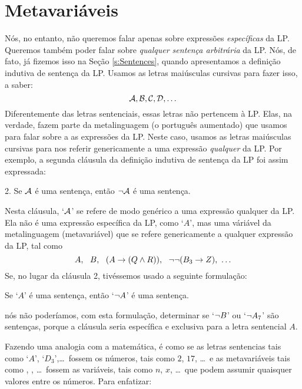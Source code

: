 \section{Metavariáveis}\label{s:Metavariables}
Nós, no entanto, não queremos falar apenas sobre expressões \emph{específicas} da LP. 
Queremos também poder falar sobre \emph{qualquer sentença arbitrária} da LP.
Nós, de fato, já fizemos isso na Seção \ref{s:Sentences}, quando apresentamos a definição indutiva de sentença da LP.
Usamos as letras maiúsculas cursivas para fazer isso, a saber:
	$$\mathcal{A}, \mathcal{B}, \mathcal{C}, \mathcal{D}, \ldots$$
Diferentemente das letras sentenciais, essas letras não pertencem à LP.
Elas, na verdade, fazem parte da metalinguagem (o português aumentado) que usamos para falar sobre a as expressões da LP.
Neste caso, usamos as letras maiúsculas cursivas para nos referir genericamente a uma expressão \emph{qualquer} da LP.
Por exemplo, a segunda cláusula da definição indutiva de sentença da LP foi assim expressada:
	\begin{earg}
		\item[2.] Se $\mathcal{A}$ é uma sentença, então $\neg \mathcal{A}$ é uma sentença.
	\end{earg}
Nesta cláusula, `$\mathcal{A}$' se refere de modo genérico a uma expressão qualquer da LP.
Ela não é uma expressão específica da LP, como `$A$', mas uma váriável da metalinguagem (metavariável) que se refere genericamente a qualquer expressão da LP, tal como $$A,\ \ B,\ \  (A \eif (Q \eand R)),\ \  \enot\enot(B_3 \eif Z),\ \ldots$$
Se, no lugar da cláusula 2, tivéssemos usado a seguinte formulação:
	\begin{ebullet}
		\item Se `$A$' é uma sentença, então `$\neg A$' é uma sentença.
	\end{ebullet}
nós não poderíamos, com esta formulação, determinar se `$\neg B$' ou `$\neg A_7$' são sentenças, porque a cláusula seria específica e exclusiva para a letra sentencial $A$.

Fazendo uma analogia com a matemática, é como se as letras sentencias tais como `$A$', `$D_3$',\ldots\ fossem os números, tais como $2$, $17$, \ldots\ e as metavariáveis tais como , , \ldots\ fossem as variáveis, tais como $n$, $x$, \ldots\ que podem assumir quaisquer valores entre os números.
Para enfatizar:

